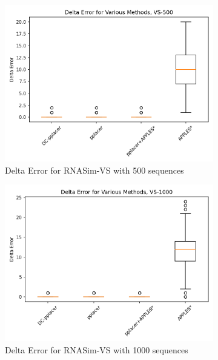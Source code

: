 \documentclass[10pt]{article}
\begin{document}
\begin{figure}[!htb]
\begin{subfigure}{0.5\textwidth}
\centering
\includegraphics[width=\textwidth]{Figs/VS-delta-error-500-BW.png}
\caption{Delta Error for RNASim-VS with 500 sequences}
\label{fig:error500}
\end{subfigure}
\begin{subfigure}{0.5\textwidth}
\centering
\includegraphics[width=\textwidth]{Figs/VS-delta-error-1000-BW.png}
\caption{Delta Error for RNASim-VS with 1000 sequences}
\label{fig:error1000}
\end{subfigure}\\
\begin{subfigure}{0.5\textwidth}

\end{subfigure}
\end{figure}
\end{document}
